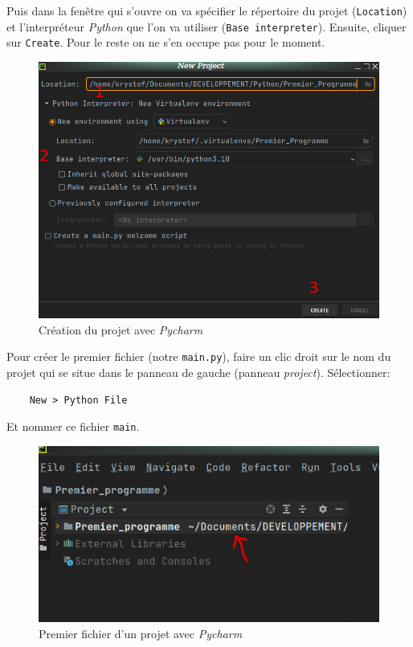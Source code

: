 \documentclass[a4paper,12pt]{book}
\begin{document}
Puis dans la fenêtre qui s'ouvre on va spécifier le répertoire du projet (\texttt{Location}) et l'interpréteur \textit{Python} que l'on va utiliser (\texttt{Base interpreter}). Ensuite, cliquer sur \texttt{Create}. Pour le reste on ne s'en occupe pas pour le moment.
\begin{figure}[h]
\begin{center}
\includegraphics[scale=0.25]{IMG/Pycharm-02.png}
\caption{Création du projet avec \textit{Pycharm}}
\end{center}
\end{figure}
\medskip

Pour créer le premier fichier (notre \texttt{main.py}), faire un clic droit sur le nom du projet qui se situe dans le panneau de gauche (panneau \textit{project}). Sélectionner:
\begin{verbatim}
    New > Python File
\end{verbatim} 
Et nommer ce fichier \texttt{main}.
\begin{figure}[h]
\begin{center}
\includegraphics[scale=0.5]{IMG/Pycharm-03.png}
\caption{Premier fichier d'un projet avec \textit{Pycharm}}
\end{center}
\end{figure}
\medskip
\end{document}

